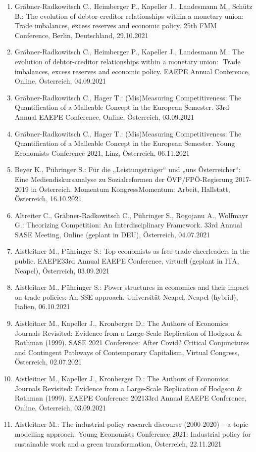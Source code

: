 \begin{enumerate}
	\item Gräbner-Radkowitsch C., Heimberger P., Kapeller J., Landesmann M., Schütz B.: The evolution of debtor-creditor relationships within a monetary union:  Trade imbalances, excess reserves and economic policy. 25th FMM Conference, Berlin, Deutschland, 29.10.2021
	\item Gräbner-Radkowitsch C., Heimberger P., Kapeller J., Landesmann M.: The evolution of debtor-creditor relationships within a monetary union:  Trade imbalances, excess reserves and economic policy. EAEPE Annual Conference, Online, Österreich, 04.09.2021
	\item Gräbner-Radkowitsch C., Hager T.: (Mis)Measuring Competitiveness: The Quantification of a Malleable Concept in the European Semester. 33rd Annual EAEPE Conference, Online, Österreich, 03.09.2021
	\item Gräbner-Radkowitsch C., Hager T.: (Mis)Measuring Competitiveness:  The Quantification of a Malleable Concept in the European Semester. Young Economists Conference 2021, Linz, Österreich, 06.11.2021
	\item Beyer K., Pühringer S.: \glqq Für die „Leistungsträger“ und „uns Österreicher“: Eine Mediendiskursanalyse zu Sozialreformen der ÖVP/FPÖ-Regierung 2017-2019 in Österreich\grqq{}. Momentum KongressMomentum: Arbeit, Hallstatt, Österreich, 16.10.2021
	\item Altreiter C., Gräbner-Radkowitsch C., Pühringer S., Rogojanu A., Wolfmayr G.: Theorizing Competition: An Interdisciplinary Framework. 33rd Annual SASE Meeting, Online (geplant in DEU), Österreich, 04.07.2021
	\item Aistleitner M., Pühringer S.: Top economists as free-trade cheerleaders in the public. EAEPE33rd Annual EAEPE Conference, virtuell (geplant in ITA, Neapel), Österreich, 03.09.2021
	\item Aistleitner M., Pühringer S.: Power structures in economics and their impact on trade policies: An SSE approach. Universität Neapel, Neapel (hybrid), Italien, 06.10.2021
	\item Aistleitner M., Kapeller J., Kronberger D.: The Authors of Economics Journals Revisited: Evidence from a Large-Scale Replication of Hodgson \& Rothman (1999). SASE 2021 Conference: After Covid? Critical Conjunctures and Contingent Pathways of Contemporary Capitalism, Virtual Congress, Österreich, 02.07.2021
	\item Aistleitner M., Kapeller J., Kronberger D.: The Authors of Economics Journals Revisited: Evidence from a Large-Scale Replication of Hodgson \& Rothman (1999). EAEPE Conference 202133rd Annual EAEPE Conference, Online, Österreich, 03.09.2021
	\item Aistleitner M.: The industrial policy research discourse (2000-2020) – a topic modelling approach. Young Economists Conference 2021: Industrial policy for sustainable work and a green transformation, Österreich, 22.11.2021
\end{enumerate}
